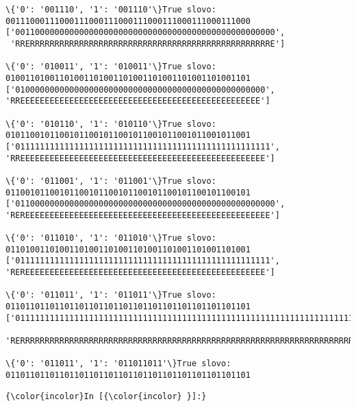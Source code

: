 \documentclass{article}
\begin{document}
\begin{Verbatim}[commandchars=\\\{\}]
\{'0': '001110', '1': '001110'\}True slovo: 00111000111000111000111000111000111000111000111000
['00110000000000000000000000000000000000000000000000000',
 'RRERRRRRRRRRRRRRRRRRRRRRRRRRRRRRRRRRRRRRRRRRRRRRRRRRE']

\{'0': '010011', '1': '010011'\}True slovo: 01001101001101001101001101001101001101001101001101
['010000000000000000000000000000000000000000000000000', 
'RREEEEEEEEEEEEEEEEEEEEEEEEEEEEEEEEEEEEEEEEEEEEEEEEE']

\{'0': '010110', '1': '010110'\}True slovo: 01011001011001011001011001011001011001011001011001
['0111111111111111111111111111111111111111111111111111', 
'RREEEEEEEEEEEEEEEEEEEEEEEEEEEEEEEEEEEEEEEEEEEEEEEEEE']

\{'0': '011001', '1': '011001'\}True slovo: 01100101100101100101100101100101100101100101100101
['01100000000000000000000000000000000000000000000000000', 
'REREEEEEEEEEEEEEEEEEEEEEEEEEEEEEEEEEEEEEEEEEEEEEEEEEE']

\{'0': '011010', '1': '011010'\}True slovo: 01101001101001101001101001101001101001101001101001
['0111111111111111111111111111111111111111111111111111', 
'REREEEEEEEEEEEEEEEEEEEEEEEEEEEEEEEEEEEEEEEEEEEEEEEEE']

\{'0': '011011', '1': '011011'\}True slovo: 01101101101101101101101101101101101101101101101101
['01111111111111111111111111111111111111111111111111111111111111111111111111111111111111111111111111111',
 'RERRRRRRRRRRRRRRRRRRRRRRRRRRRRRRRRRRRRRRRRRRRRRRRRRRRRRRRRRRRRRRRRRRRRRRRRRRRRRRRRRRRRRRRRRRRRRRRRRRR']

\{'0': '011011', '1': '011011011'\}True slovo: 01101101101101101101101101101101101101101101101101
    \end{Verbatim}

    \begin{Verbatim}[commandchars=\\\{\}]
{\color{incolor}In [{\color{incolor} }]:} 
\end{Verbatim}


    
    
    
    
\end{document}
